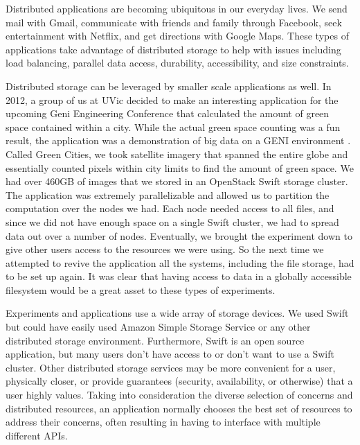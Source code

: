\label{chapter:intro}

Distributed applications are becoming ubiquitous in our everyday lives. We
send mail with Gmail, communicate with friends and family through Facebook,
seek entertainment with Netflix, and get directions with Google Maps. These
types of applications take advantage of distributed storage to help with
issues including load balancing, parallel data access, durability,
accessibility, and size constraints.

Distributed storage can be leveraged by smaller scale applications as well. In
2012, a group of us at UVic decided to make an interesting application for the
upcoming Geni Engineering Conference that calculated the amount of green space
contained within a city. While the actual green space counting was a fun
result, the application was a demonstration of big data on a GENI environment
\cite{Geni}. Called Green Cities, we took satellite imagery that spanned the
entire globe and essentially counted pixels within city limits to find the
amount of green space. We had over 460GB of images that we stored in an
OpenStack Swift \cite{Swift} storage cluster. The application was extremely
parallelizable and allowed us to partition the computation over the nodes we
had. Each node needed access to all files, and since we did not have enough
space on a single Swift cluster, we had to spread data out over a number of
nodes. Eventually, we brought the experiment down to give other users access
to the resources we were using. So the next time we attempted to revive the
application all the systems, including the file storage, had to be set up
again. It was clear that having access to data in a globally accessible
filesystem would be a great asset to these types of experiments.

Experiments and applications use a wide array of storage devices. We used
Swift but could have easily used Amazon Simple Storage Service \cite{amazons3}
or any other distributed storage environment. Furthermore, Swift is an open
source application, but many users don’t have access to or don't want to use a
Swift cluster. Other distributed storage services may be more convenient for a
user, physically closer, or provide guarantees (security, availability, or
otherwise) that a user highly values. Taking into consideration the diverse
selection of concerns and distributed resources, an application normally
chooses the best set of resources to address their concerns, often resulting
in having to interface with multiple different APIs.

